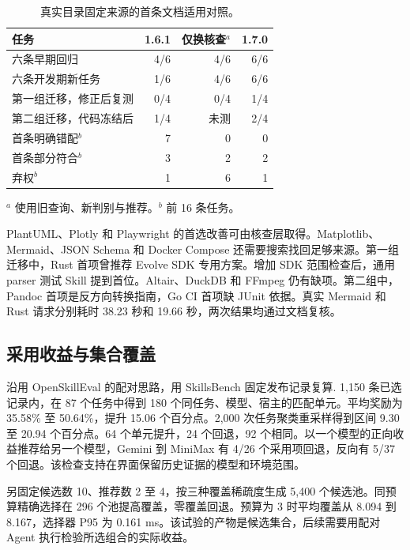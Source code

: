 \documentclass[final,5p,twocolumn,10pt]{elsarticle}
\begin{document}
\begin{table}[!ht]
\centering\small
\caption{真实目录固定来源的首条文档适用对照。}
\label{tab:ptiteration}
\begin{tabularx}{\columnwidth}{@{}Xrrr@{}}
\toprule
任务 & 1.6.1 & 仅换核查$^{a}$ & 1.7.0 \\
\midrule
六条早期回归 & 4/6 & 4/6 & 6/6 \\
六条开发期新任务 & 1/6 & 4/6 & 6/6 \\
第一组迁移，修正后复测 & 0/4 & 0/4 & 1/4 \\
第二组迁移，代码冻结后 & 1/4 & 未测 & 2/4 \\
首条明确错配$^{b}$ & 7 & 0 & 0 \\
首条部分符合$^{b}$ & 3 & 2 & 2 \\
弃权$^{b}$ & 1 & 6 & 1 \\
\bottomrule
\end{tabularx}
\par\smallskip\raggedright\footnotesize $^{a}$ 使用旧查询、新判别与推荐。$^{b}$ 前 16 条任务。
\end{table}

PlantUML、Plotly 和 Playwright 的首选改善可由核查层取得。Matplotlib、Mermaid、JSON Schema 和 Docker Compose 还需要搜索找回足够来源。第一组迁移中，Rust 首项曾推荐 Evolve SDK 专用方案。增加 SDK 范围检查后，通用 parser 测试 Skill 提到首位。Altair、DuckDB 和 FFmpeg 仍有缺项。第二组中，Pandoc 首项是反方向转换指南，Go CI 首项缺 JUnit 依据。真实 Mermaid 和 Rust 请求分别耗时 38.23 秒和 19.66 秒，两次结果均通过文档复核。

\subsection{采用收益与集合覆盖}

沿用 OpenSkillEval 的配对思路\cite{open}，用 SkillsBench 固定发布记录复算\cite{skillsbench}. 1,150 条已选记录内，在 87 个任务中得到 180 个同任务、模型、宿主的匹配单元。平均奖励为 35.58\% 至 50.64\%，提升 15.06 个百分点。2,000 次任务聚类重采样得到区间 9.30 至 20.94 个百分点。64 个单元提升，24 个回退，92 个相同。以一个模型的正向收益推荐给另一个模型，Gemini 到 MiniMax 有 4/26 个采用项回退，反向有 5/37 个回退。该检查支持在界面保留历史证据的模型和环境范围。

另固定候选数 10、推荐数 2 至 4，按三种覆盖稀疏度生成 5,400 个候选池。同预算精确选择在 296 个池提高覆盖，零覆盖回退。预算为 3 时平均覆盖从 8.094 到 8.167，选择器 P95 为 0.161 ms。该试验的产物是候选集合，后续需要用配对 Agent 执行检验所选组合的实际收益。
\end{document}
